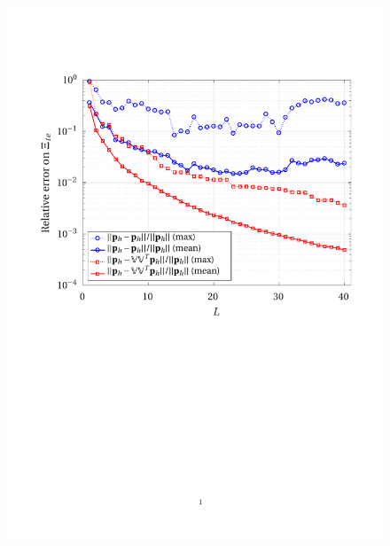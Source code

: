 \documentclass[12pt, a4paper, twoside, openright]{report}
\numberwithin{equation}{chapter}
\theoremstyle{theorem}
\theoremstyle{definition}
\theoremstyle{remark}
\theoremstyle{proposition}
\numberwithin{figure}{chapter}
\begin{document}
	\begin{figure}[H]
		\center
		\includegraphics[scale = 0.75, trim = {1.5cm 12cm 1cm 3.5cm}, clip]{dc_200_p_error_vs_rank}
	\end{figure}
	
\end{document}
